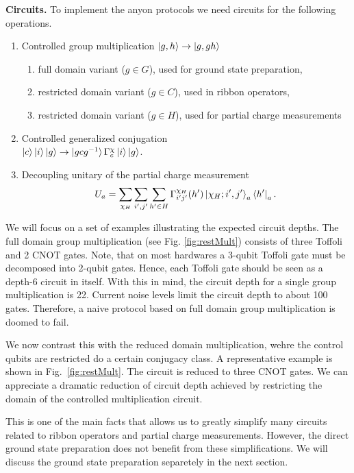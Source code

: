 \documentclass[two column]{article}
\begin{document}
\textbf{Circuits.} To implement the anyon protocols we need circuits for the following operations.
\begin{enumerate}
    \item Controlled group multiplication $\ket{g, h} \rightarrow \ket{g, gh}$  \begin{enumerate}
        \item full domain variant ($g \in G$), used for ground state preparation,
        \item restricted domain variant ($g \in C$), used in ribbon operators,
        \item restricted domain variant ($g \in H$), used for partial charge measurements 
    \end{enumerate}
    \item Controlled generalized conjugation\\ $\ket{c} \ket{i}\ket{g} \rightarrow \ket{gcg^{-1}} \Gamma^\chi_{c} \ket{i}\ket{g}$.
    \item Decoupling unitary of the partial charge measurement $$ U_a = \sum_{\chi_H}\sum_{i', j'}\sum_{h'\in H}  \Gamma^{\chi_H}_{i'j'}(h')  \ket{\chi_H; i', j'}_a\bra{h'}_a. $$
\end{enumerate} 

We will focus on a set of examples illustrating the expected circuit depths. The full domain group multiplication (see Fig. \ref{fig:restMult}) consists of three Toffoli and 2 CNOT gates. Note, that on most hardwares a 3-qubit Toffoli gate must be decomposed into 2-qubit gates. Hence, each Toffoli gate should be seen as a depth-6 circuit in itself. With this in mind, the circuit depth for a single group multiplication is 22. Current noise levels limit the circuit depth to about 100 gates. Therefore, a naive protocol based on full domain group multiplication is doomed to fail. 

We now contrast this with the reduced domain multiplication, wehre the control qubits are restricted do a certain conjugacy class. A representative example is shown in Fig.~\ref{fig:restMult}. The circuit is reduced to three CNOT gates. We can appreciate a dramatic reduction of circuit depth achieved by restricting the domain of the controlled multiplication circuit.

This is one of the main facts that allows us to greatly simplify many circuits related to ribbon operators and partial charge measurements. However, the direct ground state preparation does not benefit from these simplifications. We will discuss the ground state preparation separetely in the next section.
\end{document}

